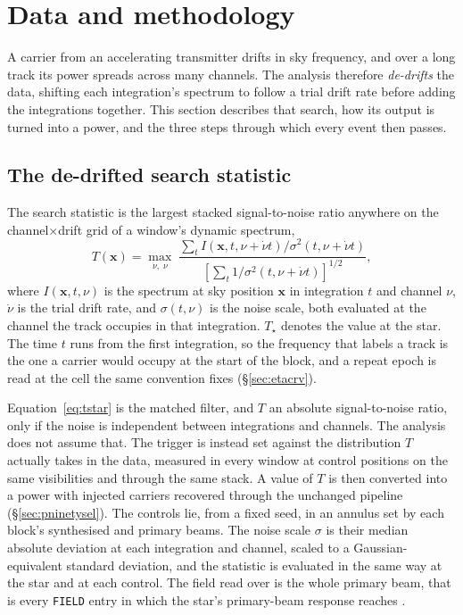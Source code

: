 \section{Data and methodology}
\label{sec:method}

A carrier from an accelerating transmitter drifts in sky frequency, and over
a long track its power spreads across many channels. The analysis therefore
\emph{de-drifts} the data, shifting each integration's spectrum to follow a
trial drift rate before adding the integrations together. This section
describes that search, how its output is turned into a power, and the three
steps through which every event then passes.

\subsection{The de-drifted search statistic}
\label{sec:statistic}

The search statistic is the largest stacked signal-to-noise ratio anywhere on
the channel$\times$drift grid of a window's dynamic spectrum,
%
\begin{equation}
T(\mathbf{x})=\max_{\dot\nu,\;\nu}\;
\frac{\sum_{t} I\!\left(\mathbf{x},t,\nu+\dot\nu t\right)
       \big/\sigma^{2}(t,\nu+\dot\nu t)}
     {\left[\sum_{t}1\big/\sigma^{2}(t,\nu+\dot\nu t)\right]^{1/2}},
\label{eq:tstar}
\end{equation}
%
where $I(\mathbf{x},t,\nu)$ is the spectrum at sky position $\mathbf{x}$ in
integration $t$ and channel $\nu$, $\dot\nu$ is the trial drift rate, and
$\sigma(t,\nu)$ is the noise scale, both evaluated at the channel the track
occupies in that integration. $T_\star$ denotes the value at the star. The
time $t$ runs from the first integration, so the frequency that labels a
track is the one a carrier would occupy at the start of the block, and a
repeat epoch is read at the cell the same convention fixes
(\S\ref{sec:etacrv}).

Equation~\ref{eq:tstar} is the matched filter, and $T$ an absolute
signal-to-noise ratio, only if the noise is independent between integrations
and channels. The analysis does not assume that. The trigger is instead set
against the distribution $T$ actually takes in the data, measured in every
window at \NCtrl{} control positions on the same visibilities and through the
same stack. A value of $T$ is then converted into a power with injected
carriers recovered through the unchanged pipeline (\S\ref{sec:pninetysel}).
The controls lie, from a fixed seed, in an annulus set by each block's
synthesised and primary beams. The noise scale $\sigma$ is their median
absolute deviation at each integration and channel, scaled to a
Gaussian-equivalent standard deviation, and the statistic is evaluated in the
same way at the star and at each control. The field read over is the whole
primary beam, that is every \texttt{FIELD} entry in which the star's
primary-beam response reaches \BgFieldMinResp.

